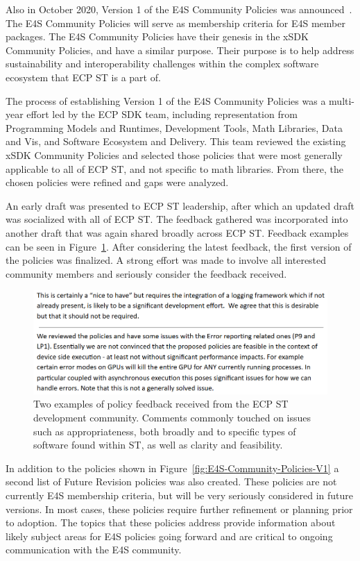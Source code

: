 Also in October 2020, Version 1 of the E4S Community Policies was announced~\cite{e4s:policies}. The E4S Community Policies will serve as membership criteria for E4S member packages. The E4S Community Policies have their genesis in the xSDK Community Policies, and have a similar purpose. Their purpose is to help address sustainability and interoperability challenges within the complex software ecosystem that ECP ST is a part of.

The process of establishing Version 1 of the E4S Community Policies was a multi-year effort led by the ECP SDK team, including representation from Programming Models and Runtimes, Development Tools, Math Libraries, Data and Vis, and Software Ecosystem and Delivery. This team reviewed the existing xSDK Community Policies and selected those policies that were most generally applicable to all of ECP ST, and not specific to math libraries. From there, the chosen policies were refined and gaps were analyzed.

An early draft was presented to ECP ST leadership, after which an updated draft was socialized with all of ECP ST. The feedback gathered was incorporated into another draft that was again shared broadly across ECP ST. Feedback examples can be seen in Figure~\ref{fig:e4s-policy-feedback}. After considering the latest feedback, the first version of the policies was finalized. A strong effort was made to involve all interested community members and seriously consider the feedback received.

\begin{figure}
        \centering
        \includegraphics[width=0.9\linewidth]{projects/2.3.5-Ecosystem/2.3.5.01-Ecosystem-SDK/E4S-policy-comment}
        \caption{Two examples of policy feedback received from the ECP ST development community. Comments commonly touched on issues such as appropriateness, both broadly and to specific types of software found within ST, as well as clarity and feasibility.}
        \label{fig:e4s-policy-feedback}
\end{figure}

In addition to the policies shown in Figure~\ref{fig:E4S-Community-Policies-V1} a second list of Future Revision policies was also created. These policies are not currently E4S membership criteria, but will be very seriously considered in future versions. In most cases, these policies require further refinement or planning prior to adoption. The topics that these policies address provide information about likely subject areas for E4S policies going forward and are critical to ongoing communication with the E4S community.


